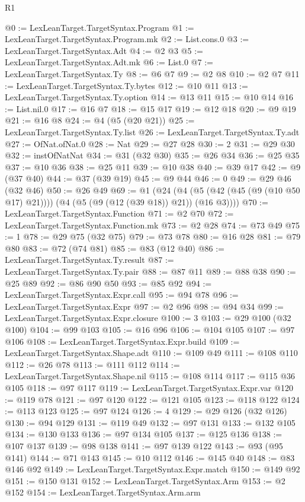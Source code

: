 \begin{lexlean}{R1}
\begin{coremodule}
{{{{{{{{{{{{{{{{{{{{{{{{{{{{{{{{{{{{{{{{{{{{{{{{{{{{{{{{{{{{{{{{{{{{{{{{{{{{{{{{{{{{{{{{{{{{{{{{{{{{{{{{{{{{{{{{{{{{{{{{{{{{{{{{{{{{{{{{{{{{{{{{{{{{{{{{{{{{{{{{{{{{{{{{{{{{{{{{{{{{{{{{{{@0 := LexLeanTarget.TargetSyntax.Program
@1 := LexLeanTarget.TargetSyntax.Program.mk
@2 := List.cons.{0}
@3 := LexLeanTarget.TargetSyntax.Adt
@4 := @2 @3
@5 := LexLeanTarget.TargetSyntax.Adt.mk
@6 := List.{0}
@7 := LexLeanTarget.TargetSyntax.Ty
@8 := @6 @7
@9 := @2 @8
@10 := @2 @7
@11 := LexLeanTarget.TargetSyntax.Ty.bytes
@12 := @10 @11
@13 := LexLeanTarget.TargetSyntax.Ty.option
@14 := @13 @11
@15 := @10 @14
@16 := List.nil.{0}
@17 := @16 @7
@18 := @15 @17
@19 := @12 @18
@20 := @9 @19
@21 := @16 @8
@24 := @4 (@5 (@20 @21))
@25 := LexLeanTarget.TargetSyntax.Ty.list
@26 := LexLeanTarget.TargetSyntax.Ty.adt
@27 := OfNat.ofNat.{0}
@28 := Nat
@29 := @27 @28
@30 := 2
@31 := @29 @30
@32 := instOfNatNat
@34 := @31 (@32 @30)
@35 := @26 @34
@36 := @25 @35
@37 := @10 @36
@38 := @25 @11
@39 := @10 @38
@40 := @39 @17
@42 := @9 (@37 @40)
@44 := @37 (@39 @19)
@45 := @9 @44
@46 := 0
@49 := @29 @46 (@32 @46)
@50 := @26 @49
@69 := @1
    (@24 (@4 (@5 (@42 (@45 (@9 (@10 @50 @17) @21)))) (@4 (@5 (@9 (@12 (@39 @18)) @21)) (@16 @3))))
@70 := LexLeanTarget.TargetSyntax.Function
@71 := @2 @70
@72 := LexLeanTarget.TargetSyntax.Function.mk
@73 := @2 @28
@74 := @73 @49
@75 := 1
@78 := @29 @75 (@32 @75)
@79 := @73 @78
@80 := @16 @28
@81 := @79 @80
@83 := @72 (@74 @81)
@85 := @83 (@12 @40)
@86 := LexLeanTarget.TargetSyntax.Ty.result
@87 := LexLeanTarget.TargetSyntax.Ty.pair
@88 := @87 @11
@89 := @88 @38
@90 := @25 @89
@92 := @86 @90 @50
@93 := @85 @92
@94 := LexLeanTarget.TargetSyntax.Expr.call
@95 := @94 @78
@96 := LexLeanTarget.TargetSyntax.Expr
@97 := @2 @96
@98 := @94 @34
@99 := LexLeanTarget.TargetSyntax.Expr.closure
@100 := 3
@103 := @29 @100 (@32 @100)
@104 := @99 @103
@105 := @16 @96
@106 := @104 @105
@107 := @97 @106
@108 := LexLeanTarget.TargetSyntax.Expr.build
@109 := LexLeanTarget.TargetSyntax.Shape.adt
@110 := @109 @49
@111 := @108 @110
@112 := @26 @78
@113 := @111 @112
@114 := LexLeanTarget.TargetSyntax.Shape.nil
@115 := @108 @114
@117 := @115 @36 @105
@118 := @97 @117
@119 := LexLeanTarget.TargetSyntax.Expr.var
@120 := @119 @78
@121 := @97 @120
@122 := @121 @105
@123 := @118 @122
@124 := @113 @123
@125 := @97 @124
@126 := 4
@129 := @29 @126 (@32 @126)
@130 := @94 @129
@131 := @119 @49
@132 := @97 @131
@133 := @132 @105
@134 := @130 @133
@136 := @97 @134 @105
@137 := @125 @136
@138 := @107 @137
@139 := @98 @138
@141 := @97 @139 @122
@143 := @93 (@95 @141)
@144 := @71 @143
@145 := @10 @112
@146 := @145 @40
@148 := @83 @146 @92
@149 := LexLeanTarget.TargetSyntax.Expr.match
@150 := @149 @92
@151 := @150 @131
@152 := LexLeanTarget.TargetSyntax.Arm
@153 := @2 @152
@154 := LexLeanTarget.TargetSyntax.Arm.arm
}}}}}}}}}}}}}}}}}}}}}}}}}}}}}}}}}}}}}}}}}}}}}}}}}}}}}}}}}}}}}}}}}}}}}}}}}}}}}}}}}}}}}}}}}}}}}}}}}}}}}}}}}}}}}}}}}}}}}}}}}}}}}}}}}}}}}}}}}}}}}}}}}}}}}}}}}}}}}}}}}}}}}}}}}}}}}}}}}}}}}}}}}}
\end{coremodule}
\end{lexlean}
